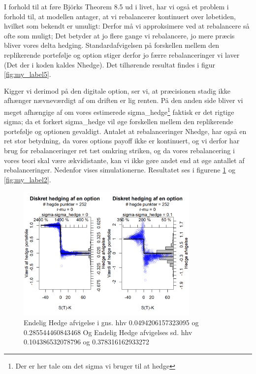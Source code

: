 \documentclass{article}
\theoremstyle{definition}
\theoremstyle{remark}
\begin{document}
I forhold til at føre Björks Theorem 8.5 \cite{Bjork2020} ud i livet, har vi også et problem i forhold til, at modellen antager, at vi rebalancerer kontinuert over løbetiden, hvilket som bekendt er umuligt: Derfor må vi approksimere ved at rebalancere så ofte som muligt; Det betyder at jo flere gange vi rebalancere, jo mere præcis bliver vores delta hedging. Standardafvigelsen på forskellen mellem den replikerende portefølje og option stiger derfor jo færre rebalanceringer vi laver (Det der i koden kaldes Nhedge). Det tilhørende resultat findes i figur \ref{fig:my_label5}.


Kigger vi derimod på den digitale option, ser vi, at præcisionen stadig ikke afhænger nævneværdigt af om driften er lig renten\sout{\color{red}{, selvom vi stadig gør brug af Q-målet}}. På den anden side bliver vi meget afhængige af om vores estimerede sigma\_hedge\footnote{Der er her tale om det sigma vi bruger til at hedge} faktisk er det rigtige sigma; da et forkert sigma\_hedge vil øge forskellen mellem den replikerende portefølje og optionen gevaldigt. Antalet at rebalanceringer Nhedge, har også en ret stor betydning, da vores options payoff ikke er kontinuert, og vi derfor har brug for rebalanceringer ret tæt omkring striken, og da vores rebalancering i vores teori skal være ækvidistante, kan vi ikke gøre andet end at øge antallet af rebalanceringer. Nedenfor vises simulationerne. Resultatet ses i figurene \ref{fig:my_label3} og \ref{fig:my_label2}.
\begin{figure}
    \centering
    \includegraphics[width=3.5in]{Overleaf/3 opttype_standard_sigma.png}
    \caption{Endelig Hedge afvigelse i gns. hhv 0.0494206157323095 og 0.285544460843468 Og Endelig Hedge afvigelses sd. hhv 0.104386532078796 og 0.378316162933272}
    \label{fig:my_label3}
\end{figure}
\end{document}
